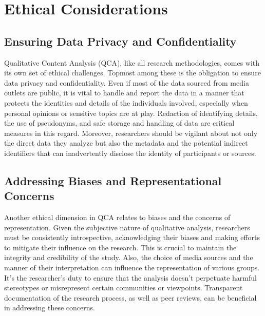 \documentclass[
  b5paper]{book}
\begin{document}
\hypertarget{ethical-considerations-3}{%
\section{Ethical Considerations}\label{ethical-considerations-3}}

\hypertarget{ensuring-data-privacy-and-confidentiality}{%
\subsection*{Ensuring Data Privacy and Confidentiality}\label{ensuring-data-privacy-and-confidentiality}}

Qualitative Content Analysis (QCA), like all research methodologies, comes with its own set of ethical challenges. Topmost among these is the obligation to ensure data privacy and confidentiality. Even if most of the data sourced from media outlets are public, it is vital to handle and report the data in a manner that protects the identities and details of the individuals involved, especially when personal opinions or sensitive topics are at play. Redaction of identifying details, the use of pseudonyms, and safe storage and handling of data are critical measures in this regard. Moreover, researchers should be vigilant about not only the direct data they analyze but also the metadata and the potential indirect identifiers that can inadvertently disclose the identity of participants or sources.

\hypertarget{addressing-biases-and-representational-concerns}{%
\subsection*{Addressing Biases and Representational Concerns}\label{addressing-biases-and-representational-concerns}}

Another ethical dimension in QCA relates to biases and the concerns of representation. Given the subjective nature of qualitative analysis, researchers must be consistently introspective, acknowledging their biases and making efforts to mitigate their influence on the research. This is crucial to maintain the integrity and credibility of the study. Also, the choice of media sources and the manner of their interpretation can influence the representation of various groups. It's the researcher's duty to ensure that the analysis doesn't perpetuate harmful stereotypes or misrepresent certain communities or viewpoints. Transparent documentation of the research process, as well as peer reviews, can be beneficial in addressing these concerns.
\end{document}

